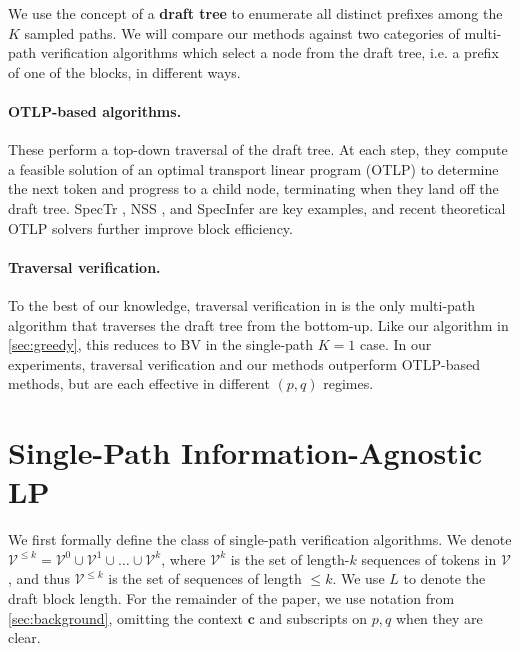 \documentclass{article}
\theoremstyle{plain}
\theoremstyle{definition}
\theoremstyle{remark}
\newcommand{\V}{\mathcal{V}}
\newcommand{\con}{\boldsymbol{c}}
\begin{document}
We use the concept of a \textbf{draft tree} to enumerate all distinct prefixes among the $K$ sampled paths. We will compare our methods against two categories of multi-path verification algorithms which select a node from the draft tree, i.e. a prefix of one of the blocks, in different ways.

\paragraph{OTLP-based algorithms.} These perform a top-down traversal of the draft tree. At each step, they compute a feasible solution of an optimal transport linear program (OTLP) to determine the next token and progress to a child node, terminating when they land off the draft tree. SpecTr \citep{sun2023spectr}, NSS \citep{miao2024specinfer}, and SpecInfer \citep{miao2024specinfer} are key examples, and recent theoretical OTLP solvers \citep{khisti2025multi,hu2025towards} further improve block efficiency.

\paragraph{Traversal verification.} To the best of our knowledge, traversal verification in \citet{weng2025traversal} is the only multi-path algorithm that traverses the draft tree from the bottom-up. Like our algorithm in \cref{sec:greedy}, this reduces to BV in the single-path $K=1$ case. In our experiments, traversal verification and our methods outperform OTLP-based methods, but are each effective in different $(p,q)$ regimes.




\section{Single-Path Information-Agnostic LP}
\label{sec:single-path-lp}

We first formally define the class of single-path verification algorithms. We denote $\V^{\leq k} = \V^0 \cup \V^1 \cup \ldots \cup \V^k$, where $\V^k$ is the set of length-$k$ sequences of tokens in $\V$, and thus $\V^{\leq k}$ is the set of sequences of length $\leq k$. We use $L$ to denote the draft block length. For the remainder of the paper, we use notation from \cref{sec:background}, omitting the context $\con$ and subscripts on $p,q$ when they are clear.
\end{document}
